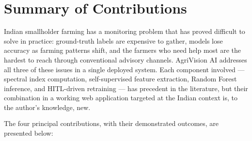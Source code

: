\documentclass[12pt,a4paper,oneside]{report}
\begin{document}
\section{Summary of Contributions}

Indian smallholder farming has a monitoring problem that has proved difficult to solve in practice: ground-truth labels are expensive to gather, models lose accuracy as farming patterns shift, and the farmers who need help most are the hardest to reach through conventional advisory channels. AgriVision AI addresses all three of these issues in a single deployed system. Each component involved — spectral index computation, self-supervised feature extraction, Random Forest inference, and HITL-driven retraining — has precedent in the literature, but their combination in a working web application targeted at the Indian context is, to the author's knowledge, new.

The four principal contributions, with their demonstrated outcomes, are presented
below:
\end{document}
